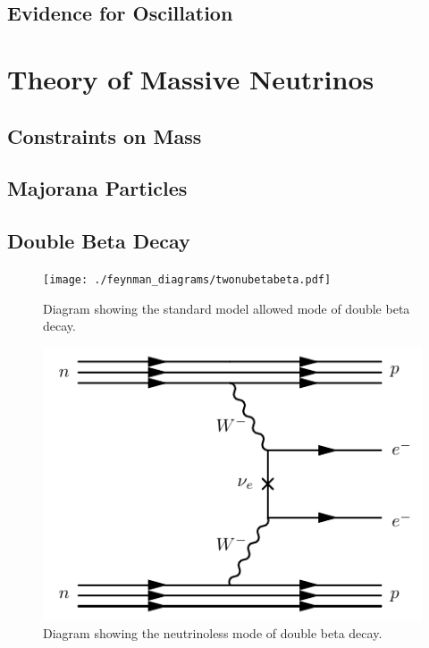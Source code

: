 \documentclass[herrin-thesis.tex]{subfiles}
\begin{document}
\subsection{Evidence for Oscillation}

\section{Theory of Massive Neutrinos}
\subsection{Constraints on Mass}

\subsection{Majorana Particles}

\subsection{Double Beta Decay}

\begin{figure}
	\centering
	\texttt{[image: ./feynman\_diagrams/twonubetabeta.pdf]}
	\caption[Diagram of 2nbb]{Diagram showing the standard model allowed mode of double beta decay.}
	\label{fig:diagram_2nubb}
\end{figure}
\begin{figure}
	\centering
	\includegraphics[width=0.6\columnwidth]{./feynman_diagrams/zeronubetabeta.pdf}
	\caption[Diagram of 0nbb]{Diagram showing the neutrinoless mode of double beta decay.}
	\label{fig:diagram_0nubb}
\end{figure}
\end{document}
